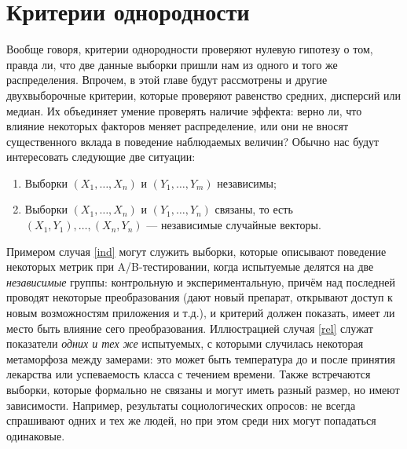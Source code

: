 \section{Критерии однородности}\label{homogeneity}

Вообще говоря, критерии однородности проверяют нулевую гипотезу о том, правда ли, что две данные выборки пришли нам из одного и того же распределения. Впрочем, в этой главе будут рассмотрены и другие двухвыборочные критерии, которые проверяют равенство средних, дисперсий или медиан. Их объединяет умение проверять наличие эффекта: верно ли, что влияние некоторых факторов меняет распределение, или они не вносят существенного вклада в поведение наблюдаемых величин? Обычно нас будут интересовать следующие две ситуации:
\begin{enumerate}[label=]
    \renewcommand{\labelenumi}{\textbf{Ind}}
    \item\label{ind} Выборки $(X_1, \ldots, X_n)$ и $(Y_1, \ldots, Y_m)$ независимы;
    \renewcommand{\labelenumi}{\textbf{Rel}}
    \item\label{rel} Выборки $(X_1, \ldots, X_n)$ и $(Y_1, \ldots, Y_n)$ связаны, то есть $(X_1, Y_1), \ldots, (X_n, Y_n)$ --- независимые случайные векторы.
\end{enumerate}

Примером случая \ref{ind} могут служить выборки, которые описывают поведение некоторых метрик при A/B-тестировании, когда испытуемые делятся на две \textit{независимые} группы: контрольную и экспериментальную, причём над последней проводят некоторые преобразования (дают новый препарат, открывают доступ к новым возможностям приложения и т.д.), и критерий должен показать, имеет ли место быть влияние сего преобразования. Иллюстрацией случая \ref{rel} служат показатели \textit{одних и тех же} испытуемых, с которыми случилась некоторая метаморфоза между замерами: это может быть температура до и после принятия лекарства или успеваемость класса с течением времени. Также встречаются выборки, которые формально не связаны и могут иметь разный размер, но имеют зависимости. Например, результаты социологических опросов: не всегда спрашивают одних и тех же людей, но при этом среди них могут попадаться одинаковые.

